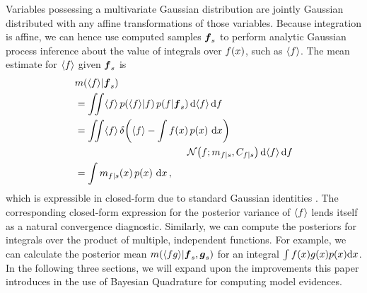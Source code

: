 \documentclass[twoside]{article}
\begin{document}
Variables possessing a multivariate Gaussian distribution are jointly Gaussian distributed with any affine transformations of those variables. Because integration is affine, we can hence use computed samples $\boldsymbol{f}_s$ to perform analytic Gaussian process inference about the value of integrals over $f(x)$, such as $\langle f \rangle$. The mean estimate for $\langle f \rangle$ given $\boldsymbol{f}_s$ is
%
\begin{align} \label{eq:mean_dnty_f}
&
\mean{\inty{f}}{\vf_s} 
\nonumber\\
& =\iint \inty{f}\,\p{\inty{f}}{f}\p{f}{\vf_s} \ud \inty{f} \,\ud f                                                                                                                                                               \nonumber\\
&
 =\iint \inty{f}\,\dd{\inty{f}}{\int f(\lfv)\,\po{\lfv}\,\ud\lfv}
\nonumber\\
& \hspace{4cm}
\N{f}{\meancondfn{f}{s}}{C_{f|s}} \ud \inty{f} \,\ud f 
\nonumber\\
&
 = \int \meancondfn{f}{s}(\lfv)\,\po{\lfv}\,\ud\lfv
\,,
\end{align}
which is expressible in closed-form due to standard Gaussian identities \cite{BZMonteCarlo}.
%
The corresponding closed-form expression for the posterior variance of $\langle f \rangle$ lends itself as a natural convergence diagnostic. Similarly, we can compute the posteriors for integrals over the product of multiple, independent functions. For example, we can calculate the posterior mean 
${m}\!\left(\langle f g \rangle\middle\vert\boldsymbol{f}_s, \boldsymbol{g}_s\right)$ for an integral $\int f(x) g(x) p(x) \mathrm{d} x$. 
 In the following three sections, we will expand upon the improvements this paper introduces in the use of Bayesian Quadrature for computing model evidences.
\end{document}
